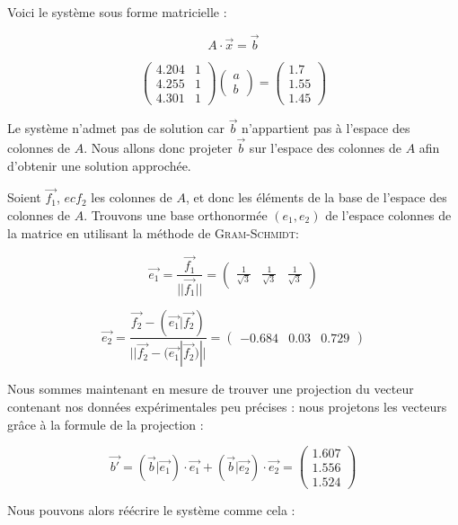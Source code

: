 Voici le système sous forme matricielle :

$$A \cdot \vec{x} = \vec{b}$$

$$
\begin{pmatrix}
4.204 & 1\\
4.255 & 1 \\
4.301 & 1
\end{pmatrix} 
\begin{pmatrix}
a\\
b
\end{pmatrix} 
= 
\begin{pmatrix}
1.7\\
1.55\\
1.45
\end{pmatrix}
$$
	

Le système n'admet pas de solution car $\vec{b}$ n'appartient pas à l'espace des colonnes de $A$. Nous
allons donc projeter $\vec{b}$ sur l'espace des colonnes de $A$ afin d'obtenir une solution approchée.

Soient $\vec{f_1}$, $ec{f_2}$ les colonnes de $A$, et donc les éléments de la base de l'espace des colonnes de $A$.
Trouvons une base orthonormée $(e_1, e_2)$ de l'espace colonnes de la matrice en utilisant
la méthode de \textsc{Gram-Schmidt}:

$$ \vec {e_1} = \frac{\vec{f_1}}{||\vec{f_1}||} = \begin{pmatrix} \frac{1}{\sqrt{3}} & \frac{1}{\sqrt{3}} &\frac{1}{\sqrt{3}} \end{pmatrix}$$

$$ \vec {e_2} = \frac{ \vec{f_2} - (\vec{e_1}|\vec{f_2})}{||\vec{f_2} - (\vec{e_1}|\vec{f_2})||} = \begin{pmatrix}
-0.684 & 0.03 & 0.729 \end{pmatrix} $$

Nous sommes maintenant en mesure de trouver une projection du vecteur contenant nos données expérimentales
peu précises :
nous projetons les vecteurs grâce à la formule de la projection :


$$
\vec{b'}
=
(\vec{b}|\vec{e_1}) \cdot \vec{e_1} + (\vec{b}|\vec{e_2}) \cdot \vec{e_2}
=
\begin{pmatrix}
1.607\\
1.556\\
1.524
\end{pmatrix}
$$

Nous pouvons alors réécrire le système comme cela :

